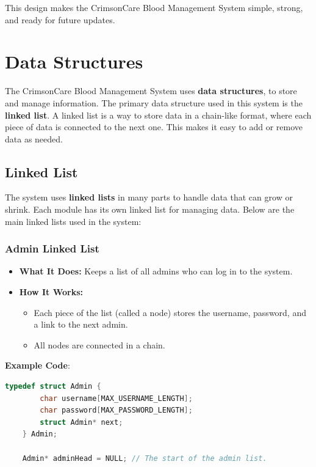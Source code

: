 \documentclass[12pt,a4paper]{report}
\begin{document}
This design makes the CrimsonCare Blood Management System simple, strong, and ready for future updates.

\section{Data Structures}
The CrimsonCare Blood Management System uses \textbf{data structures},
to store and manage information. The primary data structure used in this system is the \textbf{linked list}.
A linked list is a way to store data in a chain-like format, where each piece of
data is connected to the next one. This makes it easy to add or remove data as needed.

\subsection{Linked List}
The system uses \textbf{linked lists} in many parts to handle data that can grow or shrink.
Each module has its own linked list for managing data. Below are the main linked lists used in the system:

\subsubsection{Admin Linked List}
\begin{itemize}
    \item \normalsize \textbf{What It Does:} Keeps a list of all admins who can log in to the system.
    \item \normalsize \textbf{How It Works:}
    \begin{itemize}
        \item Each piece of the list (called a node) stores the username, password, and a link to the next admin.
        \item All nodes are connected in a chain.
    \end{itemize}
\end{itemize}

\normalsize \textbf{Example Code}:
\begin{lstlisting}[language=C, caption=Admin Linked List]
    typedef struct Admin {
        char username[MAX_USERNAME_LENGTH];
        char password[MAX_PASSWORD_LENGTH];
        struct Admin* next;
    } Admin;

    Admin* adminHead = NULL; // The start of the admin list.
\end{lstlisting}
\end{document}
